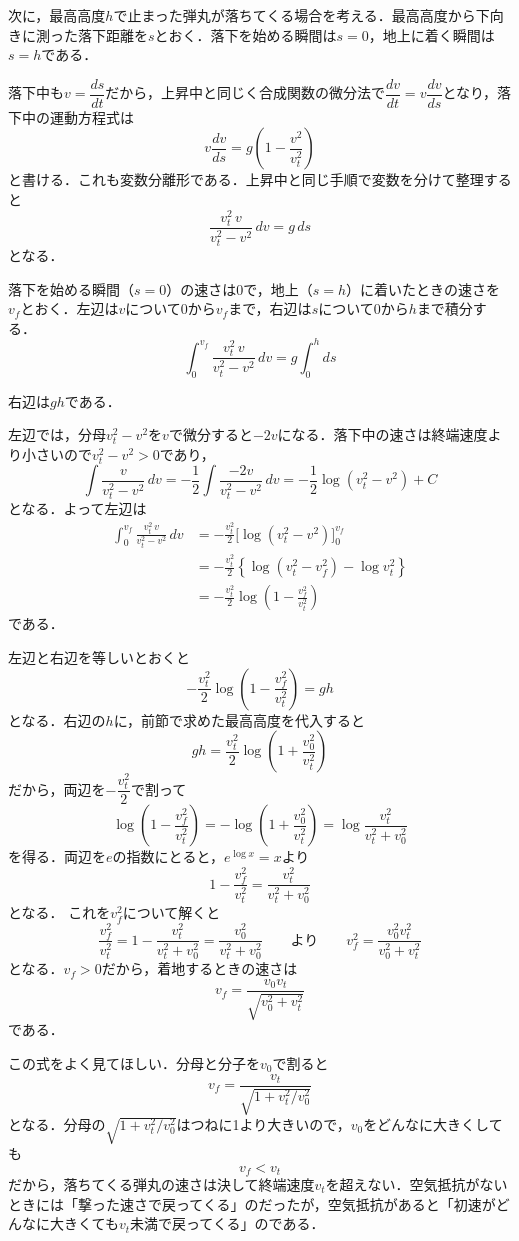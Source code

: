 \documentclass[a4paper,12pt]{jarticle}
\theoremstyle{definition}%
\begin{document}
次に，最高高度$h$で止まった弾丸が落ちてくる場合を考える．最高高度から下向きに測った落下距離を$s$とおく．落下を始める瞬間は$s=0$，地上に着く瞬間は$s=h$である．

落下中も$v=\dfrac{ds}{dt}$だから，上昇中と同じく合成関数の微分法で$\dfrac{dv}{dt}=v\dfrac{dv}{ds}$となり，落下中の運動方程式は
\[
v\frac{dv}{ds}=g\left(1-\frac{v^2}{v_t^2}\right)
\]
と書ける．これも変数分離形である．上昇中と同じ手順で変数を分けて整理すると
\[
\frac{v_t^2\,v}{v_t^2-v^2}\,dv=g\,ds
\]
となる．

落下を始める瞬間（$s=0$）の速さは0で，地上（$s=h$）に着いたときの速さを$v_f$とおく．左辺は$v$について$0$から$v_f$まで，右辺は$s$について$0$から$h$まで積分する．
\[
\int_{0}^{v_f}\frac{v_t^2\,v}{v_t^2-v^2}\,dv=g\int_0^h ds
\]

右辺は$gh$である．

左辺では，分母$v_t^2-v^2$を$v$で微分すると$-2v$になる．落下中の速さは終端速度より小さいので$v_t^2-v^2>0$であり，
\[
\int\frac{v}{v_t^2-v^2}\,dv=-\frac{1}{2}\int\frac{-2v}{v_t^2-v^2}\,dv=-\frac{1}{2}\log(v_t^2-v^2)+C
\]
となる．よって左辺は
\begin{align*}
\int_{0}^{v_f}\frac{v_t^2\,v}{v_t^2-v^2}\,dv
&=-\frac{v_t^2}{2}\Big[\log(v_t^2-v^2)\Big]_{0}^{v_f}\\
&=-\frac{v_t^2}{2}\left\{\log(v_t^2-v_f^2)-\log v_t^2\right\}\\
&=-\frac{v_t^2}{2}\log\left(1-\frac{v_f^2}{v_t^2}\right)
\end{align*}
である．

左辺と右辺を等しいとおくと
\[
-\frac{v_t^2}{2}\log\left(1-\frac{v_f^2}{v_t^2}\right)=gh
\]
となる．右辺の$h$に，前節で求めた最高高度を代入すると
\[
gh=\frac{v_t^2}{2}\log\left(1+\frac{v_0^2}{v_t^2}\right)
\]
だから，両辺を$-\dfrac{v_t^2}{2}$で割って
\[
\log\left(1-\frac{v_f^2}{v_t^2}\right)=-\log\left(1+\frac{v_0^2}{v_t^2}\right)=\log\frac{v_t^2}{v_t^2+v_0^2}
\]
を得る．両辺を$e$の指数にとると，$e^{\log x}=x$より
\[
1-\frac{v_f^2}{v_t^2}=\frac{v_t^2}{v_t^2+v_0^2}
\]
となる．
これを$v_f^2$について解くと
\[
\frac{v_f^2}{v_t^2}=1-\frac{v_t^2}{v_t^2+v_0^2}=\frac{v_0^2}{v_t^2+v_0^2}
\qquad\text{より}\qquad
v_f^2=\frac{v_0^2v_t^2}{v_0^2+v_t^2}
\]
となる．$v_f>0$だから，着地するときの速さは
\[
v_f=\frac{v_0v_t}{\sqrt{v_0^2+v_t^2}}
\]
である．

この式をよく見てほしい．分母と分子を$v_0$で割ると
\[
v_f=\frac{v_t}{\sqrt{1+v_t^2/v_0^2}}
\]
となる．分母の$\sqrt{1+v_t^2/v_0^2}$はつねに1より大きいので，$v_0$をどんなに大きくしても
\[
v_f<v_t
\]
だから，落ちてくる弾丸の速さは決して終端速度$v_t$を超えない．空気抵抗がないときには「撃った速さで戻ってくる」のだったが，空気抵抗があると「初速がどんなに大きくても$v_t$未満で戻ってくる」のである．
\end{document}
